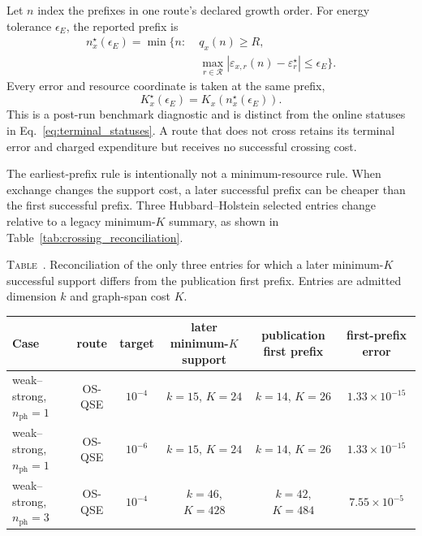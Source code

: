 \documentclass[
  reprint,
  amsmath,
  amssymb,
  aps,
  pra,
  nofootinbib,
  superscriptaddress,
  floatfix
]{revtex4-2}
\newcommand{\mathcalR}{\mathcal{R}}
\newcommand{\nph}{n_{\mathrm{ph}}}
\newcommand{\inlinetablecaption}[2]{%
  \refstepcounter{table}\label{#1}%
  \noindent\textsc{Table~\thetable.} #2\par\vspace{0.6ex}%
}
\begin{document}
Let $n$ index the prefixes in one route's declared growth order.  For energy
tolerance $\epsilon_E$, the reported prefix is
\begin{equation}
 \begin{aligned}
 n_x^\star(\epsilon_E)=\min\biggl\{n:\;&q_x(n)\geq R,\\[-0.4ex]
 &\max_{r\in\mathcalR}
 |\varepsilon_{x,r}(n)-\varepsilon_r^\star|\leq\epsilon_E
 \biggr\}.
 \end{aligned}
 \label{eq:first_crossing}
\end{equation}
Every error and resource coordinate is taken at the same prefix,
\begin{equation}
 K_x^\star(\epsilon_E)=K_x\!\left(n_x^\star(\epsilon_E)\right).
 \label{eq:crossing_cost}
\end{equation}
This is a post-run benchmark diagnostic and is distinct from the online
statuses in Eq.~\eqref{eq:terminal_statuses}.  A route that does not cross
retains its terminal error and charged expenditure but receives no successful
crossing cost.

The earliest-prefix rule is intentionally not a minimum-resource rule.  When
exchange changes the support cost, a later successful prefix can be cheaper
than the first successful prefix.  Three Hubbard--Holstein selected entries
change relative to a legacy minimum-$K$ summary, as shown in
Table~\ref{tab:crossing_reconciliation}.

\begin{widetext}
\inlinetablecaption{tab:crossing_reconciliation}{Reconciliation of the only
three entries for which a later minimum-$K$ successful support differs from
the publication first prefix.  Entries are admitted dimension $k$ and
graph-span cost $K$.}
\begin{center}
\small
\begin{tabular*}{\textwidth}{@{\extracolsep{\fill}}lccccc@{}}
\toprule
Case & route & target & later minimum-$K$ support & publication first prefix & first-prefix error \\
\midrule
weak--strong, $\nph=1$ & OS-QSE & $10^{-4}$ & $k=15$, $K=24$ & $k=14$, $K=26$ & $1.33\times10^{-15}$ \\
weak--strong, $\nph=1$ & OS-QSE & $10^{-6}$ & $k=15$, $K=24$ & $k=14$, $K=26$ & $1.33\times10^{-15}$ \\
weak--strong, $\nph=3$ & OS-QSE & $10^{-4}$ & $k=46$, $K=428$ & $k=42$, $K=484$ & $7.55\times10^{-5}$ \\
\bottomrule
\end{tabular*}
\end{center}
\end{widetext}
\end{document}
